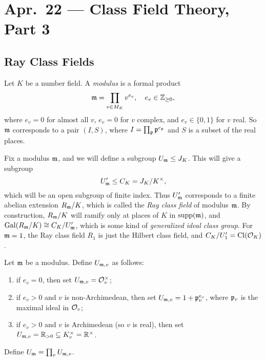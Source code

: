 \chapter{Apr.~22 --- Class Field Theory, Part 3}

\section{Ray Class Fields}

\begin{definition}
  Let $K$ be a number field.
  A \emph{modulus} is a formal product
  \[
    \mathfrak{m} = \prod_{v \in M_K} v^{e_v},
    \quad e_v \in \mathbb{Z}_{\ge 0},
  \]
  where $e_v = 0$ for almost all $v$,
  $e_v = 0$ for $v$ complex, and
  $e_v \in \{0, 1\}$ for $v$ real.
  So $\mathfrak{m}$ corresponds to a
  pair $(I, S)$, where $I = \prod_{\mathfrak{p}} \mathfrak{p}^{e_{\mathfrak{p}}}$
  and $S$ is a subset of the real places.
\end{definition}

\begin{remark}
  Fix a modulus $\mathfrak{m}$, and we
  will define a subgroup $U_{\mathfrak{m}} \le J_K$.
  This will give a subgroup
  \[
    U_{\mathfrak{m}}' \le C_K = J_K / K^\times,
  \]
  which will be an open subgroup of
  finite index. Thus $U_{\mathfrak{m}}'$ corresponds
  to a finite abelian extension
  $R_{\mathfrak{m}} / K$, which is called the
  \emph{Ray class field} of modulus $\mathfrak{m}$.
  By construction, $R_{\mathfrak{m}} / K$ will ramify
  only at places of $K$ in $\operatorname{supp}(\mathfrak{m})$, and
  $\operatorname{Gal}(R_{\mathfrak{m}} / K) \cong C_K / U_{\mathfrak{m}}'$,
  which is some kind of \emph{generalized ideal class group}.
  For $\mathfrak{m} = 1$, the Ray class field
  $R_1$ is just the Hilbert class field,
  and $C_K / U_1' = \operatorname{Cl}(\mathcal{O}_K)$.
\end{remark}

\begin{definition}
  Let $\mathfrak{m}$ be a modulus. Define $U_{\mathfrak{m}, v}$
  as follows:
  \begin{enumerate}
    \item if $e_v = 0$, then set
      $U_{\mathfrak{m}, v} = \mathcal{O}_v^\times$;
    \item if $e_v > 0$ and
      $v$ is non-Archimedean, then
      set $U_{\mathfrak{m}, v} = 1 + \mathfrak{p}_v^{e_v}$,
      where $\mathfrak{p}_v$ is the maximal ideal
      in $\mathcal{O}_v$;
    \item if $e_v > 0$ and $v$ is
      Archimedean (so $v$ is real), then
      set $U_{\mathfrak{m}, v} = \mathbb{R}_{> 0} \subseteq K_v^\times = \mathbb{R}^\times$.
  \end{enumerate}
  Define $U_{\mathfrak{m}} = \prod_v U_{\mathfrak{m}, v}$.
\end{definition}

